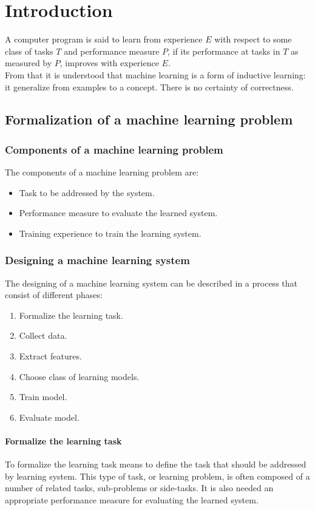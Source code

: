 \chapter{Introduction}
A computer program is said to learn from experience $E$ with respect to some class of tasks $T$ and performance measure $P$, if its performance at tasks in $T$ as measured by $P$, improves with experience $E$.\\
From that it is understood that machine learning is a form of inductive learning: it generalize from examples to a concept.
There is no certainty of correctness.

\section{Formalization of a machine learning problem}

	\subsection{Components of a machine learning problem}
	The components of a machine learning problem are:

	\begin{itemize}
		\item Task to be addressed by the system.
		\item Performance measure to evaluate the learned system.
		\item Training experience to train the learning system.
	\end{itemize}

	\subsection{Designing a machine learning system}
	The designing of a machine learning system can be described in a process that consist of different phases:

	\begin{enumerate}
		\item Formalize the learning task.
		\item Collect data.
		\item Extract features.
		\item Choose class of learning models.
		\item Train model.
		\item Evaluate model.
	\end{enumerate}

		\subsubsection{Formalize the learning task}
		To formalize the learning task means to define the task that should be addressed by learning system.
		This type of task, or learning problem, is often composed of a number of related tasks, sub-problems or side-tasks.
		It is also needed an appropriate performance measure for evaluating the learned system.
	
